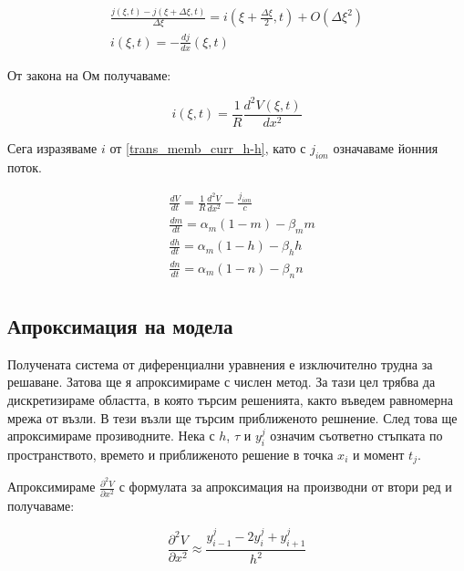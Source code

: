 \documentclass{article}
\numberwithin{equation}{section}
\begin{document}
    \begin{gather*} 
        \frac{j\left(\xi,t\right) - j\left(\xi + \Delta\xi, t\right)}{\Delta\xi} = i\left(\xi + \frac{\Delta\xi}{2},t\right) +
        O\left(\Delta\xi^2\right)\\
        i\left(\xi,t\right) = -\frac{dj}{dx}\left(\xi,t\right)
     \end{gather*}

     От закона на Ом получаваме:

     \begin{equation}
         i(\xi,t) = \frac{1}{R}\frac{d^2V(\xi,t)}{dx^2}
     \end{equation}

     Сега изразяваме $i$ от \eqref{trans_memb_curr_h-h}, като с $j_{ion}$ означаваме йонния поток.

     \begin{equation}
        \begin{aligned}
            &\frac{dV}{dt} = \frac{1}{R}\frac{d^2V}{dx^2} - \frac{j_{ion}}{c}\\
            &\frac{dm}{dt} = \alpha_m(1-m) - \beta_mm\\
            &\frac{dh}{dt} = \alpha_m(1-h) - \beta_hh\\
            &\frac{dn}{dt} = \alpha_m(1-n) - \beta_nn\\
        \end{aligned}
     \end{equation}

     \subsection{Апроксимация на модела}\label{sec:approx} 
    Получената система от диференциални уравнения е изключително трудна за решаване. Затова ще я апроксимираме с числен метод. За тази цел
    трябва да дискретизираме областта, в която търсим решенията, както въведем равномерна мрежа от възли. В тези възли ще търсим
    приближеното решнение. След това ще апроксимираме прозиводните. Нека с $h$, $\tau$ и $y_i^j$ означим съответно стъпката по
    пространството, времето и приближеното решение в точка $x_i$ и момент $t_j$. 
    
    Апроксимираме $\frac{\partial^2 V}{\partial x^2}$ с формулата за апроксимация на производни от втори ред и получаваме:

    \begin{equation}\label{der:mid_space}
        \frac{\partial^2 V}{\partial x^2} \approx \frac{y_{i-1}^j - 2y_i^j + y_{i+1}^j}{h^2}
    \end{equation}
    
\end{document}
